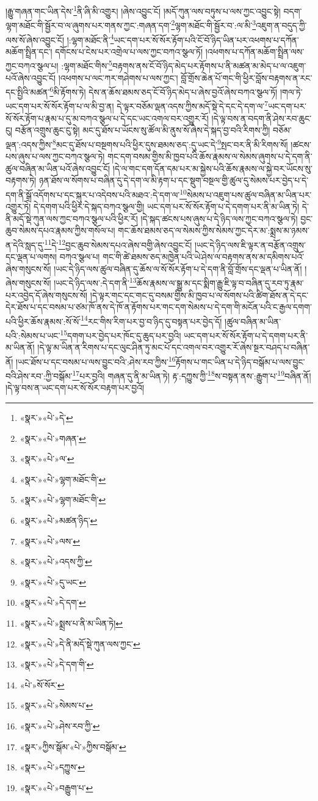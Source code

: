 །རྒྱུ་གཞན་གང་ཡིན་དེས་\footnote{«སྣར་»«པེ་»དེ་}ནི་ཞི་མི་འགྱུར། །ཞེས་འབྱུང་ངོ། །མདོ་ཀུན་ལས་བཏུས་པ་ལས་ཀྱང་འབྱུང་སྟེ། བདག་ལྷག་མཐོང་གི་སྦྱོར་བ་ལ་ཞུགས་པར་གནས་ཀྱང་:གཞན་དག་\footnote{«སྣར་»«པེ་»གཞན་}ལྷག་མཐོང་གི་སྦྱོར་བ་:ལ་མི་\footnote{«སྣར་»«པེ་»ལ་}འཇུག་ན་བདུད་ཀྱི་ལས་སོ་ཞེས་འབྱུང་ངོ། །:ལྷག་མཐོང་ནི་\footnote{«སྣར་»«པེ་»ལྷག་མཐོང་གི་}ཡང་དག་པར་སོ་སོར་རྟོག་པའི་ངོ་བོ་ཉིད་ཡིན་པར་འཕགས་པ་དཀོན་མཆོག་སྤྲིན་དང་། དགོངས་པ་ངེས་པར་འགྲེལ་པ་ལས་ཀྱང་བཀའ་སྩལ་ཏོ། །འཕགས་པ་དཀོན་མཆོག་སྤྲིན་ལས་ཀྱང་བཀའ་སྩལ་པ། :ལྷག་མཐོང་གིས་\footnote{«སྣར་»«པེ་»ལྷག་མཐོང་གི་}བརྟགས་ནས་ངོ་བོ་ཉིད་མེད་པར་རྟོགས་པ་ནི་མཚན་མ་མེད་པ་ལ་འཇུག་པའོ་ཞེས་འབྱུང་ངོ། །འཕགས་པ་ལང་ཀར་གཤེགས་པ་ལས་ཀྱང་། བློ་གྲོས་ཆེན་པོ་གང་གི་ཕྱིར་བློས་བརྟགས་ན་རང་དང་སྤྱིའི་མཚན་\footnote{«སྣར་»«པེ་»མཚན་ཉིད་}མི་རྟོགས་ཏེ། དེས་ན་ཆོས་ཐམས་ཅད་ངོ་བོ་ཉིད་མེད་པ་ཞེས་བྱའོ་ཞེས་བཀའ་སྩལ་ཏོ། །གལ་ཏེ་ཡང་དག་པར་སོ་སོར་རྟོག་པ་ལ་མི་བྱ་ན། དེ་ལྟར་བཅོམ་ལྡན་འདས་ཀྱིས་མདོ་སྡེ་དེ་དང་དེ་དག་ལ་\footnote{«སྣར་»«པེ་»ལས་}ཡང་དག་པར་སོ་སོར་རྟོག་པ་རྣམ་པ་དུ་མ་བཀའ་སྩལ་པ་དེ་དང་ཡང་འགལ་བར་འགྱུར་རོ། །དེ་ལྟ་བས་ན་བདག་ནི་ཤེས་རབ་ཆུང་ངུ། བརྩོན་འགྲུས་ཆུང་ངུ་སྟེ། མང་དུ་ཐོས་པ་ཡོངས་སུ་ཚོལ་མི་ནུས་སོ་ཞེས་དེ་སྐད་བྱ་བའི་རིགས་ཀྱི། བཅོམ་ལྡན་:འདས་ཀྱིས་\footnote{«སྣར་»«པེ་»འདས་ཀྱི་}མང་དུ་ཐོས་པ་བསྔགས་པའི་ཕྱིར་དུས་ཐམས་ཅད་:དུ་ཡང་དེ་\footnote{«སྣར་»«པེ་»དུ་ཡང་}སྤང་བར་ནི་མི་རིགས་སོ། །ཚངས་པས་ཞུས་པ་ལས་ཀྱང་བཀའ་སྩལ་ཏེ། གང་དག་བསམ་གྱིས་མི་ཁྱབ་པའི་ཆོས་རྣམས་ལ་སེམས་ཞུགས་པ་དེ་དག་ནི་ཚུལ་བཞིན་མ་ཡིན་པའོ་ཞེས་འབྱུང་ངོ། །དེ་ལ་གང་དག་དོན་དམ་པར་མ་སྐྱེས་པའི་ཆོས་རྣམས་ལ་སྐྱེ་བར་ཡོངས་སུ་བརྟགས་ཏེ། ཉན་ཐོས་ལ་སོགས་པ་བཞིན་དུ་དེ་དག་ལ་མི་རྟག་པ་དང་སྡུག་བསྔལ་གྱི་ཚུལ་དུ་སེམས་པར་བྱེད་པ་དེ་དག་ནི་སྒྲོ་འདོགས་པ་དང་སྐུར་པ་འདེབས་པའི་མཐའ་:དེ་དག་ལ་\footnote{«སྣར་»«པེ་»དེ་དག་}སེམས་པ་འཇུག་པས་ཚུལ་བཞིན་མ་ཡིན་པར་འགྱུར་ཏེ། དེ་དགག་པའི་ཕྱིར་དེ་སྐད་བཀའ་སྩལ་གྱི། ཡང་དག་པར་སོ་སོར་རྟོག་པ་དེ་དགག་པར་ནི་མ་ཡིན་ཏེ། དེ་ནི་མདོ་སྡེ་ཀུན་ལས་ཀྱང་བཀའ་སྩལ་པའི་ཕྱིར་རོ། །དེ་སྐད་ཚངས་པས་ཞུས་པ་དེ་ཉིད་ལས་ཀྱང་བཀའ་སྩལ་ཏེ། བྱང་ཆུབ་སེམས་དཔའ་རྣམས་ཀྱིས་གསོལ་པ། གང་ཆོས་ཐམས་ཅད་ལ་སེམས་ཀྱིས་སེམས་ཀྱང་དེར་མ་:སྨྲས་མ་ཉམས་ན་དེའི་སླད་དུ་\footnote{«སྣར་»«པེ་»སྨྲས་པ་ནི་མ་ཡིན་ཏེ། }དེ་\footnote{«སྣར་»«པེ་»དེ་ནི་མདོ་སྡེ་ཀུན་ལས་ཀྱང་}བྱང་ཆུབ་སེམས་དཔའ་ཞེས་བགྱི་ཞེས་འབྱུང་ངོ། །ཡང་དེ་ཉིད་ལས་ཇི་ལྟར་ན་བརྩོན་འགྲུས་དང་ལྡན་པ་ལགས། བཀའ་སྩལ་པ། གང་གི་ཚེ་ཐམས་ཅད་མཁྱེན་པའི་ཡེ་ཤེས་ལ་བརྟགས་ནས་མ་དམིགས་པའོ་ཞེས་གསུངས་སོ། །ཡང་དེ་ཉིད་ལས་ཚུལ་བཞིན་དུ་ཆོས་ལ་སོ་སོར་རྟོག་པ་དེ་དག་ནི་བློ་གྲོས་དང་ལྡན་པ་ཡིན་ནོ། །ཞེས་གསུངས་སོ། །ཡང་དེ་ཉིད་ལས་:དེ་དག་ནི་\footnote{«སྣར་»«པེ་»དེ་དག་གི་}ཆོས་རྣམས་ལ་སྒྱུ་མ་དང་སྨིག་རྒྱུ་ཇི་ལྟ་བ་བཞིན་དུ་རབ་ཏུ་རྣམ་པར་འབྱེད་དོ་ཞེས་གསུངས་སོ། །དེ་ལྟར་གང་དང་གང་དུ་བསམ་གྱིས་མི་ཁྱབ་པ་ལ་སོགས་པའི་ཚིག་ཐོས་ན་དེ་དང་དེར་ཐོས་པ་དང་བསམ་པ་ཙམ་ཁོ་ནས་དེ་ཁོ་ན་རྟོགས་པར་གང་དག་སེམས་པ་དེ་དག་གི་མངོན་པའི་ང་རྒྱལ་དགག་པའི་ཕྱིར་ཆོས་རྣམས་:སོ་སོ་\footnote{«པེ་»སོ་སོར་}རང་གིས་རིག་པར་བྱ་བ་ཉིད་དུ་བསྟན་པར་བྱེད་དོ། །ཚུལ་བཞིན་མ་ཡིན་པའི་:སེམས་པ་ཡང་\footnote{«སྣར་»«པེ་»སེམས་པ་}དགག་པར་བྱེད་པར་ཁོང་དུ་ཆུད་པར་བྱའི། ཡང་དག་པར་སོ་སོར་རྟོག་པ་དེ་དགག་པར་ནི་མ་ཡིན་ནོ། །དེ་ལྟ་མ་ཡིན་ན་རིགས་པ་དང་ལུང་ཤིན་ཏུ་མང་པོ་དང་འགལ་བར་འགྱུར་རོ་ཞེས་སྔར་བཤད་པ་བཞིན་ནོ། །ཡང་ཐོས་པ་དང་བསམ་པ་ལས་བྱུང་བའི་:ཤེས་རབ་ཀྱིས་\footnote{«སྣར་»«པེ་»ཤེས་རབ་ཀྱི་}རྟོགས་པ་གང་ཡིན་པ་དེ་ཉིད་བསྒོམ་པ་ལས་བྱུང་བའི་ཤེས་རབ་:ཀྱི་བསྒོམ་\footnote{«སྣར་»ཀྱིས་སྒོམ་«པེ་»ཀྱིས་བསྒོམ་}པར་བྱའི། གཞན་དུ་ནི་མ་ཡིན་ཏེ། རྟ་:དཀྱུས་ཀྱི་\footnote{«སྣར་»«པེ་»དཀྱུས་}ས་བསྟན་ནས་:རྒྱུག་པ་\footnote{«སྣར་»«པེ་»བརྒྱུག་པ་}བཞིན་ནོ། །དེ་ལྟ་བས་ན་ཡང་དག་པར་སོ་སོར་བརྟག་པར་བྱའོ། 